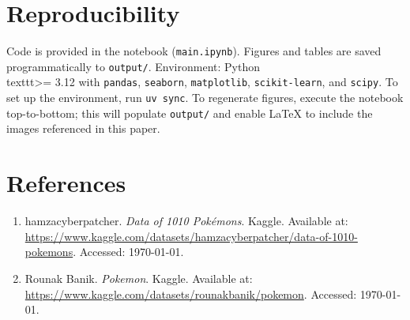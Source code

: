 \documentclass[11pt]{article}
\begin{document}
\section*{Reproducibility}
Code is provided in the notebook (\texttt{main.ipynb}). Figures and tables are saved programmatically to \texttt{output/}. Environment: Python \\texttt{>= 3.12} with \texttt{pandas}, \texttt{seaborn}, \texttt{matplotlib}, \texttt{scikit-learn}, and \texttt{scipy}. To set up the environment, run \texttt{uv sync}. To regenerate figures, execute the notebook top-to-bottom; this will populate \texttt{output/} and enable LaTeX to include the images referenced in this paper.

\section*{References}
\begin{enumerate}[leftmargin=*]
  \item hamzacyberpatcher. \emph{Data of 1010 Pokémons}. Kaggle. Available at: \url{https://www.kaggle.com/datasets/hamzacyberpatcher/data-of-1010-pokemons}. Accessed: \today.
  \item Rounak Banik. \emph{Pokemon}. Kaggle. Available at: \url{https://www.kaggle.com/datasets/rounakbanik/pokemon}. Accessed: \today.
\end{enumerate}
\end{document}
